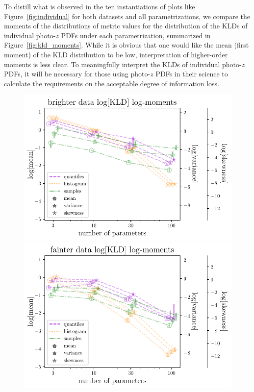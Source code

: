 \documentclass[\docopts]{\docclass}
\newcommand{\pz}{photo-$z$ PDF}
\begin{document}
To distill what is observed in the ten instantiations of plots like 
Figure~\ref{fig:individual} for both datasets and all parametrizations, we 
compare the moments of the distributions of metric values for the distribution 
of the KLDs of individual \pz s under each parametrization, summarized in 
Figure~\ref{fig:kld_moments}.
While it is obvious that one would like the mean (first moment) of the KLD 
distribution to be low, interpretation of higher-order moments is less clear.
To meaningfully interpret the KLDs of individual \pz s, it will be necessary 
for those using \pz s in their science to calculate the requirements on the 
acceptable degree of information loss.
\begin{figure}
  \begin{center}
    \includegraphics[width=\columnwidth]{graham_pz_kld.pdf}
    \includegraphics[width=\columnwidth]{schmidt_pz_kld.pdf}

\end{center}
\end{figure}
\end{document}

